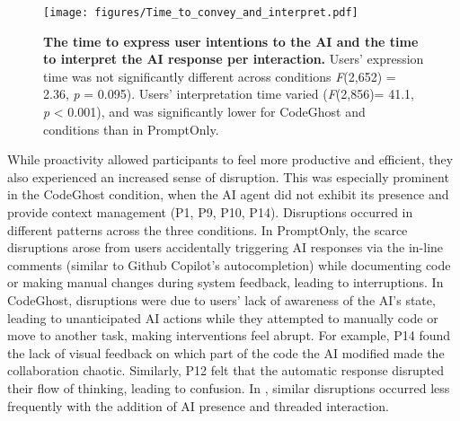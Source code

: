 \begin{figure}[t]

\centering
\texttt{[image: figures/Time\_to\_convey\_and\_interpret.pdf]}
\caption{\textbf{The time to express user intentions to the AI and the time to interpret the AI response per interaction.} \textnormal{Users' expression time was not significantly different across conditions \textit{F}(2,652) = 2.36, \textit{p} = 0.095). Users' interpretation time varied (\textit{F}(2,856)= 41.1, \textit{p} < 0.001), and was significantly lower for CodeGhost and \sys{} conditions than in PromptOnly.}}
\label{fig:time_convey_interpret}
\end{figure}

While proactivity allowed participants to feel more productive and efficient, they also experienced an increased sense of disruption.
This was especially prominent in the CodeGhost condition, when the AI agent did not exhibit its presence and provide context management (P1, P9, P10, P14).
Disruptions occurred in different patterns across the three conditions.
In PromptOnly, the scarce disruptions arose from users accidentally triggering AI responses via the in-line comments (similar to Github Copilot's autocompletion) while documenting code or making manual changes during system feedback, leading to interruptions. 
In CodeGhost, disruptions were due to users' lack of awareness of the AI's state, leading to unanticipated AI actions while they attempted to manually code or move to another task, making interventions feel abrupt. 
For example, P14 found the lack of visual feedback on which part of the code the AI modified made the collaboration chaotic.
Similarly, P12 felt that the automatic response disrupted their flow of thinking, leading to confusion.
In \sys{}, similar disruptions occurred less frequently with the addition of AI presence and threaded interaction.

